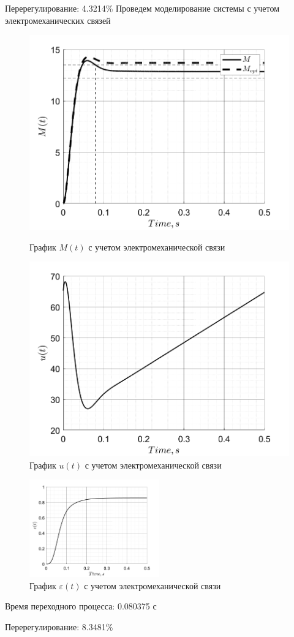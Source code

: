 Перерегулирование: 4.3214\%
\newpage
Проведем моделирование системы с учетом электромеханических связей
\begin{figure}[!h]
    \centering
    \begin{minipage}{0.5\textwidth}
        \centering
        \includegraphics[width = \textwidth]{img/task2_M}
        \caption{График $M(t)$ с учетом электромеханической связи}
        \label{fig:img/task2_M}
    \end{minipage}%
    \begin{minipage}{0.5\textwidth}
        \centering
        \includegraphics[width = \textwidth]{img/task2_u}
        \caption{График $u(t)$ с учетом электромеханической связи}
        \label{fig:img/task2_u}
    \end{minipage}%
\end{figure}
\begin{figure}[!h]
    \centering
    \includegraphics[width=0.5\textwidth]{img/task2_e}
    \caption{График $\varepsilon(t)$ с учетом электромеханической связи}
    \label{fig:task2_e}
\end{figure}

Время переходного процесса: 0.080375 с

Перерегулирование: 8.3481\%